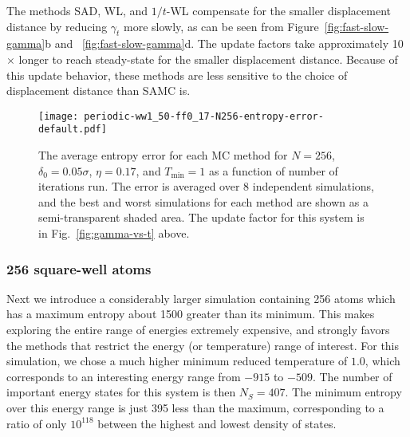 \documentclass[letterpaper,twocolumn,amsmath,amssymb,pre,aps,10pt]{revtex4-1}
\begin{document}
The methods SAD, WL, and $1/t$-WL compensate for the smaller
displacement distance by reducing $\gamma_t$ more slowly, as can be seen from
Figure~\ref{fig:fast-slow-gamma}b and ~\ref{fig:fast-slow-gamma}d.
The update factors take approximately 10$\times$ longer to reach steady-state
for the smaller displacement distance. Because of this update behavior,
these methods are less sensitive to the choice of displacement
distance than SAMC is.

%

\begin{figure}
\texttt{[image: periodic-ww1\_50-ff0\_17-N256-entropy-error-default.pdf]}
  \caption{
  The average entropy error for each MC method for $N=256$,
               $\delta_0 = 0.05\sigma$, $\eta = 0.17$, and $T_{\min} = 1$
               as a function of number of iterations run.  The error is
               averaged over 8 independent simulations, and the best
               and worst simulations for each method are shown as a
               semi-transparent shaded area.  The update factor for this
               system is in Fig.~\ref{fig:gamma-vs-t} above.}\label{fig:n256}
\end{figure}


\subsubsection{256 square-well atoms}
Next we introduce a considerably larger simulation containing 256
atoms which has a maximum entropy about 1500 greater than its minimum.
This makes exploring the entire range of energies extremely expensive,
and strongly favors the methods that restrict the energy (or
temperature) range of interest.  For this simulation, we chose a much
higher minimum reduced temperature of $1.0$, which corresponds to an
interesting energy range from $-915$ to $-509$.  The number of
important energy states for this system is then $N_S = 407$.  The
minimum entropy over this energy range is just 395 less than the
maximum, corresponding to a ratio of only $10^{118}$ between the
highest and lowest density of states.

\end{document}
